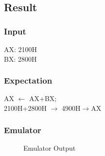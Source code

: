 \documentclass{article}
\begin{document}
\break
\subsection{Result}
\subsubsection{Input}
AX: 2100H \\
BX: 2800H \\

\subsubsection{Expectation}
AX $\leftarrow$ AX+BX; \\  
2100H+2800H $\rightarrow$ 4900H$\rightarrow$AX \\


\subsubsection{Emulator}

\begin{figure}[h]
\begin{center}
\caption{Emulator Output}
\end{center}
\end{figure}
\end{document}
